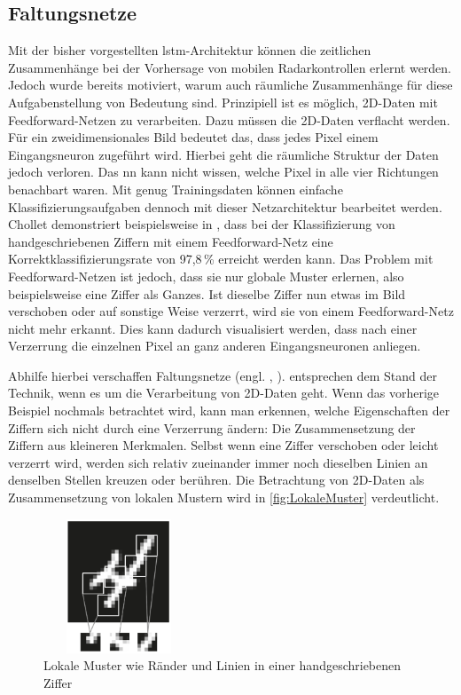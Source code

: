 \subsection{Faltungsnetze}
\label{sec:CNN}

Mit der bisher vorgestellten \acrshort{lstm}-Architektur können die zeitlichen Zusammenhänge bei der Vorhersage von mobilen Radarkontrollen erlernt werden.
Jedoch wurde bereits motiviert, warum auch räumliche Zusammenhänge für diese Aufgabenstellung von Bedeutung sind.
Prinzipiell ist es möglich, 2D-Daten mit Feedforward-Netzen zu verarbeiten.
Dazu müssen die 2D-Daten verflacht werden.
Für ein zweidimensionales Bild bedeutet das, dass jedes Pixel einem Eingangsneuron zugeführt wird.
Hierbei geht die räumliche Struktur der Daten jedoch verloren.
Das \acrshort{nn} kann nicht wissen, welche Pixel in alle vier Richtungen benachbart waren.
Mit genug Trainingsdaten können einfache Klassifizierungsaufgaben dennoch mit dieser Netzarchitektur bearbeitet werden.
Chollet demonstriert beispielsweise in \cite[S. 53]{DeepLearningPythonKeras}, dass bei der Klassifizierung von handgeschriebenen Ziffern mit einem Feedforward-Netz eine Korrektklassifizierungsrate von 97,8\,\% erreicht werden kann.
Das Problem mit Feedforward-Netzen ist jedoch, dass sie nur globale Muster erlernen, also beispielsweise eine Ziffer als Ganzes.
Ist dieselbe Ziffer nun etwas im Bild verschoben oder auf sonstige Weise verzerrt, wird sie von einem Feedforward-Netz nicht mehr erkannt.
Dies kann dadurch visualisiert werden, dass nach einer Verzerrung die einzelnen Pixel an ganz anderen Eingangsneuronen anliegen.

Abhilfe hierbei verschaffen Faltungsnetze (engl. , ).
 entsprechen dem Stand der Technik, wenn es um die Verarbeitung von 2D-Daten geht.
Wenn das vorherige Beispiel nochmals betrachtet wird, kann man erkennen, welche Eigenschaften der Ziffern sich nicht durch eine Verzerrung ändern: Die Zusammensetzung der Ziffern aus kleineren Merkmalen.
Selbst wenn eine Ziffer verschoben oder leicht verzerrt wird, werden sich relativ zueinander immer noch dieselben Linien an denselben Stellen kreuzen oder berühren.
Die Betrachtung von 2D-Daten als Zusammensetzung von lokalen Mustern wird in \autoref{fig:LokaleMuster} verdeutlicht.

\begin{figure}[h]
    \centering
    \includegraphics[width=0.4\textwidth,height=4cm,keepaspectratio=true]{content/images/LokaleMuster.png}
    \caption{Lokale Muster wie Ränder und Linien in einer handgeschriebenen Ziffer \cite[Abb. 5.1]{DeepLearningPythonKeras}}
    \label{fig:LokaleMuster}
\end{figure}


